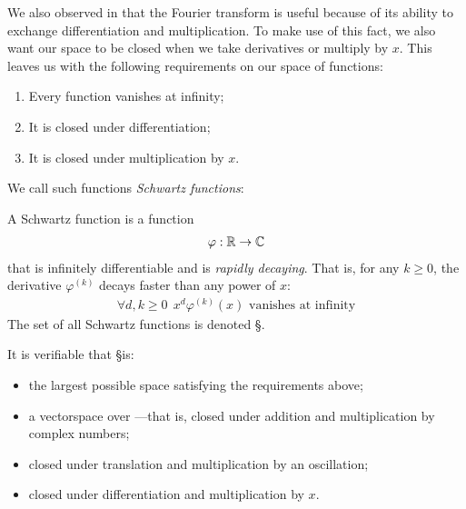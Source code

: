       We also observed in  that the Fourier transform is useful because of its ability to exchange differentiation and multiplication.
      To make use of this fact, we also want our space to be closed when we take derivatives or multiply by $x$.
      This leaves us with the following requirements on our space of functions:
      \begin{enumerate}[label=(\alph*)]
        \item \label{i:vanish}Every function vanishes at infinity;
        \item \label{i:diff}It is closed under differentiation;
        \item \label{i:mult}It is closed under multiplication by $x$.
      \end{enumerate}
      We call such functions \emph{Schwartz functions}:


      \begin{defn}
        A Schwartz function is a function
        \begin{align*}
          \varphi:\mathbb{R}\rightarrow\mathbb{C}
        \end{align*}
        that is infinitely differentiable and is \emph{rapidly decaying}.
        That is, for any $k\ge0$, the derivative $\varphi^{(k)}$ decays faster than any power of $x$:
        \begin{align*}
          \forall d,k\ge0\ \ x^d\varphi^{(k)}(x)\text{ vanishes at infinity}
        \end{align*}
        The set of all Schwartz functions is denoted \S.
      \end{defn}

      It is verifiable that \S is:
      \begin{itemize}
        \item the largest possible space satisfying the requirements above;
        \item a vectorspace over \C---that is, closed under addition and multiplication by complex numbers;
        \item closed under translation and multiplication by an oscillation;
        \item closed under differentiation and multiplication by $x$.
      \end{itemize}


